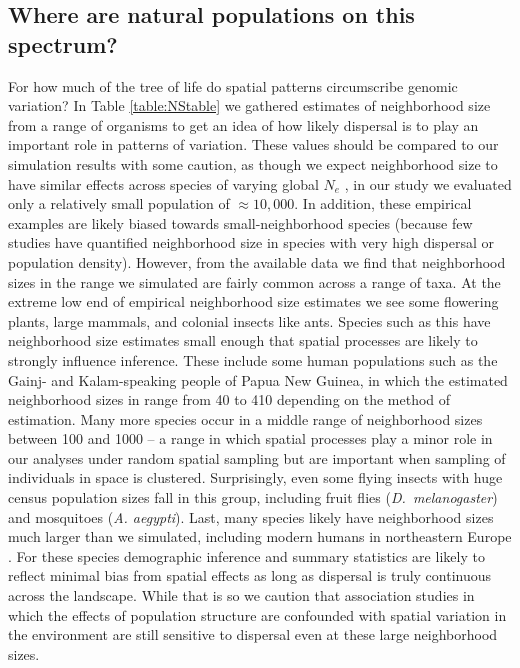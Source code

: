 \documentclass[10pt,twoside,lineno,hidelinks]{preprint}
\begin{document}
\subsection{Where are natural populations on this spectrum?}
For how much of the tree of life do spatial patterns circumscribe genomic variation? In Table \ref{table:NStable} we gathered estimates of neighborhood size from a range of organisms to get an idea of how likely dispersal is to play an important role in patterns of variation. These values should be compared to our simulation results with some caution, as though we expect neighborhood size to have similar effects across species of varying global $N_e$ \citep{Wright1946}, in our study we evaluated only a relatively small population of $\approx 10,000$. 
In addition, these empirical examples are likely biased towards small-neighborhood species (because few studies have quantified neighborhood size in species with very high dispersal or population density). However, from the available data we find that neighborhood sizes in the range we simulated are fairly common across a range of taxa. At the extreme low end of empirical neighborhood size estimates we see some flowering plants, large mammals, and colonial insects like ants. Species such as this have neighborhood size estimates small enough that spatial processes are likely to strongly influence inference.
These include some human populations such as the Gainj- and Kalam-speaking people of Papua New Guinea, in which the estimated neighborhood sizes in \citep{Rousset1997} range from 40 to 410 depending on the method of estimation. 
Many more species occur in a middle range of neighborhood sizes between 100 and 1000 -- a range in which spatial processes play a minor role in our analyses under random spatial sampling but are important when sampling of individuals in space is clustered. Surprisingly, even some flying insects with huge census population sizes fall in this group, including fruit flies (\textit{D.~melanogaster}) and mosquitoes (\textit{A. aegypti}). Last, many species likely have neighborhood sizes much larger than we simulated, including modern humans in northeastern Europe \citep{Ringbauer2017}. For these species demographic inference and summary statistics are likely to reflect minimal bias from spatial effects as long as dispersal is truly continuous across the landscape. While that is so we caution that association studies in which the effects of population structure are confounded with spatial variation in the environment are still sensitive to dispersal even at these large neighborhood sizes.
\end{document}
